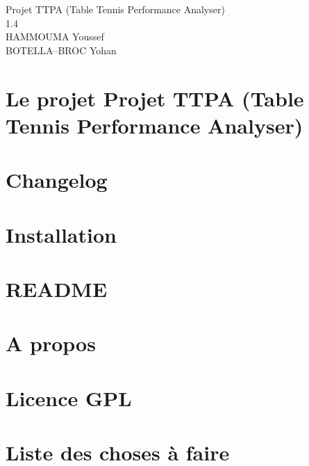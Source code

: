 \documentclass[twoside]{article}
\newcommand{\+}{\discretionary{\mbox{\scriptsize$\hookleftarrow$}}{}{}}
\begin{document}
\hypersetup{pageanchor=false,
             bookmarksnumbered=true,
             pdfencoding=unicode
            }
\begin{titlepage}
\vspace*{7cm}
\begin{center}%
{\LARGE Projet T\+T\+PA (Table Tennis Performance Analyser) \\[1ex]\large 1.\+4 }\\
\vspace*{1cm}
{\large HAMMOUMA Youssef}\\
{\large BOTELLA--BROC Yohan}\\
\end{center}
\end{titlepage}
\tableofcontents
{}
\hypersetup{pageanchor=true}

\section{Le projet Projet T\+T\+PA (Table Tennis Performance Analyser)}
\label{index}\hypertarget{index}{}
\section{Changelog}
\label{page_changelog}

\section{Installation}
\label{page_install}

\section{R\+E\+A\+D\+ME}
\label{page__r_e_a_d_m_e}

\section{A propos}
\label{page_about}

\section{Licence G\+PL}
\label{page_licence}

\section{Liste des choses à faire}
\label{todo}

\end{document}
